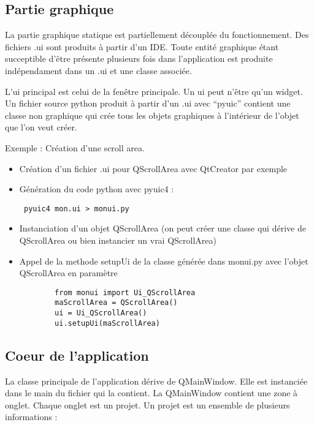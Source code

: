 \documentclass[12pt,a4paper]{article}
\begin{document}
    \subsection{Partie graphique}
        La partie graphique statique est partiellement découplée du
        fonctionnement. Des
        fichiers .ui sont produits à partir d'un IDE. Toute entité graphique
        étant succeptible d'être présente plusieurs fois dans l'application est
        produite indépendament dans un .ui et une classe associée.
        
        L'ui principal est celui de la fenêtre principale.  Un ui peut n'être
        qu'un widget. Un fichier source python produit à partir d'un .ui avec
        ``pyuic'' contient une classe non graphique qui crée tous les objets
        graphiques à l'intérieur de l'objet que l'on veut créer.

        Exemple : Création d'une scroll area.
        \begin{itemize}
            \item Création d'un fichier .ui pour QScrollArea avec QtCreator par
                exemple
            \item Génération du code python avec pyuic4 :\begin{verbatim} pyuic4 mon.ui > monui.py \end{verbatim}
            \item Instanciation d'un objet QScrollArea (on peut créer une classe qui dérive de QScrollArea ou bien instancier un vrai QScrollArea)
            \item Appel de la methode setupUi de la classe générée dans monui.py avec l'objet QScrollArea en paramètre
                \begin{verbatim}
        from monui import Ui_QScrollArea
        maScrollArea = QScrollArea()
        ui = Ui_QScrollArea()
        ui.setupUi(maScrollArea)
\end{verbatim}
        \end{itemize}
    \subsection{Coeur de l'application}
        La classe principale de l'application dérive de QMainWindow. Elle est
        instanci\'ee dans le main du fichier qui la contient. La QMainWindow
        contient une zone à onglet. Chaque onglet est un projet. Un projet est
        un ensemble de plusieurs informations :\\
\end{document}
